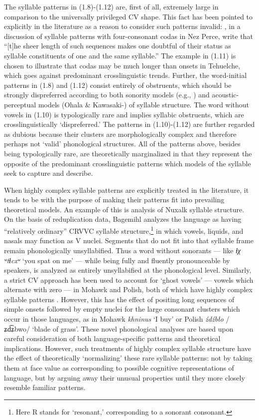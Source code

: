   The syllable patterns in (1.8)-(1.12) are, first of all, extremely large in comparison to the universally privileged CV shape. This fact has been pointed to explicitly in the literature as a reason to consider such patterns invalid: \citet[195]{KayeEtAl1990}, in a discussion of syllable patterns with four-consonant codas in Nez Perce, write that “[t]he sheer length of such sequences makes one doubtful of their status as syllable constituents of one and the same syllable.” The example in (1.11) is chosen to illustrate that codas may be much longer than onsets in Tehuelche, which goes against predominant crosslinguistic trends. Further, the word-initial patterns in (1.8) and (1.12) consist entirely of obstruents, which should be strongly dispreferred according to both sonority models (e.g., \citealt{Clements1990}) and acoustic-perceptual models (Ohala \& Kawasaki-\citealt{Fukumori1997}) of syllable structure. The word without vowels in (1.10) is typologically rare and implies syllabic obstruents, which are crosslinguistically ‘dispreferred.’ The patterns in (1.10)-(1.12) are further regarded as dubious because their clusters are morphologically complex and therefore perhaps not ‘valid’ phonological structures. All of the patterns above, besides being typologically rare, are theoretically marginalized in that they represent the opposite of the predominant crosslinguistic patterns which models of the syllable seek to capture and describe.

  When highly complex syllable patterns are explicitly treated in the literature, it tends to be with the purpose of making their patterns fit into prevailing theoretical models. An example of this is  analysis of Nuxalk syllable structure. On the basis of reduplication data, Bagemihl analyzes the language as having “relatively ordinary” CRVVC syllable structure,\footnote{ \textrm{Here R stands for ‘resonant,’ corresponding to a sonorant consonant.}} in which vowels, liquids, and nasals may function as V nuclei. Segments that do not fit into that syllable frame remain phonologically unsyllabified. Thus a word without sonorants — like \textit{ɬχ} \textit{ʷtɬcxʷ} ‘you spat on me’ — while being fully and fluently pronounceable by speakers, is analyzed as entirely unsyllabified at the phonological level. Similarly, a strict CV approach has been used to account for ‘ghost vowels’ — vowels which alternate with zero — in Mohawk and Polish, both of which have highly complex syllable patterns \citep{Rowicka1999}. However, this has the effect of positing long sequences of simple onsets followed by empty nuclei for the large consonant clusters which occur in those languages, as in Mohawk \textit{khninus} ‘I buy’ or Polish \textit{źdźbło} /ʑd͡ʑbwo/ ‘blade of grass’. These novel phonological analyses are based upon careful consideration of both language-specific patterns and theoretical implications. However, such treatments of highly complex syllable structure have the effect of theoretically ‘normalizing’ these rare syllable patterns: not by taking them at face value as corresponding to possible cognitive representations of language, but by arguing away their unusual properties until they more closely resemble familiar patterns.

